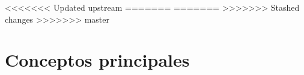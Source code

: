 <<<<<<< Updated upstream
=======
=======
>>>>>>> Stashed changes
>>>>>>> master
\section{Conceptos principales}
